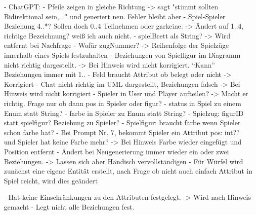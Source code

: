 - ChatGPT: 
    - Pfeile zeigen in gleiche Richtung -> sagt "stimmt sollten Bidirektional sein,..." und generiert neu. Fehler bleibt aber
    - Spiel-Spieler Beziehung 4..*? Sollen doch 0..4 Teilnehmen oder garkeine. -> Ändert auf 1..4, richtige Bezeichnung? weiß ich auch nicht.
    - spielBrett als String? -> Wird entfernt bei Nachfrage
    - Wofür zugNummer? -> Reihenfolge der Spielzüge innerhalb eines Spiels festzuhalten
    - Beziehungen von Spielfigur im Diagramm nicht richtig dargestellt. -> Bei Hinweis wird nicht korrigiert. ``Kann'' Beziehungen immer mit 1..
    - Feld braucht Attribut ob belegt oder nicht -> Korrigiert
    - Chat nicht richtig im UML dargestellt, Beziehungen falsch -> Bei Hinweis wird nicht korrigiert
    - Spieler in User und Player aufteilen? -> Macht er richtig. Frage nur ob dann pos in Spieler oder figur?
    - status in Spiel zu einem Enum statt String?
    - farbe in Spieler zu Enum statt String?
    - Spielzug: figurID statt spielfigur? Beziehung zu Spieler?
    - Spielfigur: braucht farbe wenn Spieler schon farbe hat?
    - Bei Prompt Nr. 7, bekommt Spieler ein Attribut pos: int?? und Spieler hat keine Farbe mehr? -> Bei Hinweis Farbe wieder eingefügt und Position entfernt
    - Ändert bei Neugenerierung immer wieder ein oder zwei Beziehungen. -> Lassen sich aber Händisch vervollständigen
    - Für Würfel wird zunächst eine eigene Entität erstellt, nach Frage ob nicht auch einfach Attribut in Spiel reicht, wird dies geändert

    - Hat keine Einschränkungen zu den Attributen festgelegt. -> Wird nach Hinweis gemacht
    - Legt nicht alle Beziehungen fest.


